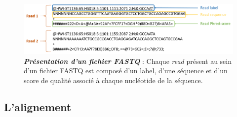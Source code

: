 \documentclass[12pt,a4paper,twoside]{ugathesis}
\theoremstyle{definition}
\theoremstyle{definition}
\theoremstyle{definition}
\theoremstyle{remark}
\begin{document}
\begin{figure}

{\centering \includegraphics[scale=.34]{figure/fastq} 

}

\caption[Présentation d'un fichier FASTQ]{\textbf{\emph{Présentation d'un fichier FASTQ}} :
Chaque \emph{read} présent au sein d'un fichier FASTQ est composé d'un
label, d'une séquence et d'un score de qualité associé à chaque
nucléotide de la séquence.}\label{fig:pictfastqformat}
\end{figure}






\newpage

\hypertarget{lalignement}{\subsection{L'alignement}\label{lalignement}}
\end{document}
